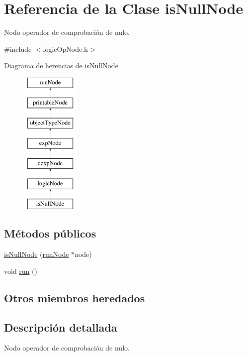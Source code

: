 \hypertarget{classisNullNode}{\section{Referencia de la Clase is\-Null\-Node}
\label{classisNullNode}
}


Nodo operador de comprobación de nulo.  




{\ttfamily \#include $<$logic\-Op\-Node.\-h$>$}

Diagrama de herencias de is\-Null\-Node\begin{figure}[H]
\begin{center}
\leavevmode
\includegraphics[height=7.000000cm]{classisNullNode}
\end{center}
\end{figure}
\subsection*{Métodos públicos}
\begin{DoxyCompactItemize}
\item 
\hyperlink{classisNullNode_aee160904eb282f4495d86384ddb02e76}{is\-Null\-Node} (\hyperlink{classrunNode}{run\-Node} $\ast$node)
\item 
void \hyperlink{classisNullNode_a0f55adb4c14683eafb6242d719164d43}{run} ()
\end{DoxyCompactItemize}
\subsection*{Otros miembros heredados}


\subsection{Descripción detallada}
Nodo operador de comprobación de nulo. 

